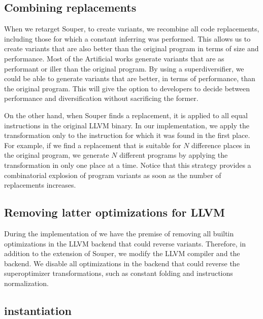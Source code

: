 \subsection*{Combining replacements}

When we retarget Souper, to create variants, we recombine all code replacements, including those for which a constant inferring was performed.
This allows us to create variants that are also better than the original program in terms of size and performance. Most of the Artificial works generate variants that are as performant or iller than the original program. By using a superdiversifier, we could be able to generate variants that are better, in terms of performance, than the original program. This will give the option to developers to decide between performance and diversification without sacrificing the former. 

On the other hand, when Souper finds a replacement, it is applied to all equal instructions in the original LLVM binary. In our implementation, we apply the transformation only to the instruction for which it was found in the first place. For example, if we find a replacement that is suitable for $N$ difference places in the original program, we generate $N$ different programs by applying the transformation in only one place at a time. Notice that this strategy provides a combinatorial explosion of program variants as soon as the number of replacements increases.

\subsection*{Removing latter optimizations for LLVM}

During the implementation of we have the premise of removing all builtin optimizations in the LLVM backend that could reverse variants.
Therefore, in addition to the extension of Souper, we modify the LLVM compiler and the \wasm backend.
We disable all optimizations in the \wasm backend that could reverse the superoptimizer transformations, such as constant folding and instructions normalization.



\subsection{instantiation}

